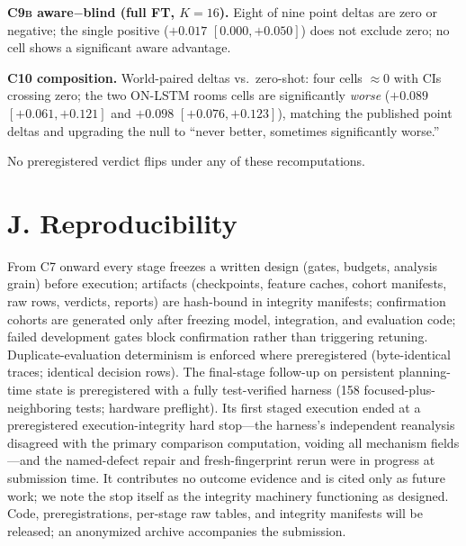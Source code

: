 \documentclass[letterpaper]{article} %
\newcommand{\stage}[1]{\textsc{#1}}
\begin{document}
\textbf{\stage{C9b} aware$-$blind (full FT, $K{=}16$).} Eight of nine point deltas are zero or negative; the single positive ($+0.017$ $[0.000,+0.050]$) does not exclude zero; no cell shows a significant aware advantage.

\textbf{\stage{C10} composition.} World-paired deltas vs.\ zero-shot: four cells $\approx$0 with CIs crossing zero; the two ON-LSTM rooms cells are significantly \emph{worse} ($+0.089$ $[+0.061,+0.121]$ and $+0.098$ $[+0.076,+0.123]$), matching the published point deltas and upgrading the null to ``never better, sometimes significantly worse.''

No preregistered verdict flips under any of these recomputations.

\section{J. Reproducibility}

From \stage{C7} onward every stage freezes a written design (gates, budgets, analysis grain) before execution; artifacts (checkpoints, feature caches, cohort manifests, raw rows, verdicts, reports) are hash-bound in integrity manifests; confirmation cohorts are generated only after freezing model, integration, and evaluation code; failed development gates block confirmation rather than triggering retuning. Duplicate-evaluation determinism is enforced where preregistered (byte-identical traces; identical decision rows). The final-stage follow-up on persistent planning-time state is preregistered with a fully test-verified harness (158 focused-plus-neighboring tests; hardware preflight). Its first staged execution ended at a preregistered execution-integrity hard stop---the harness's independent reanalysis disagreed with the primary comparison computation, voiding all mechanism fields---and the named-defect repair and fresh-fingerprint rerun were in progress at submission time. It contributes no outcome evidence and is cited only as future work; we note the stop itself as the integrity machinery functioning as designed. Code, preregistrations, per-stage raw tables, and integrity manifests will be released; an anonymized archive accompanies the submission.
\end{document}
